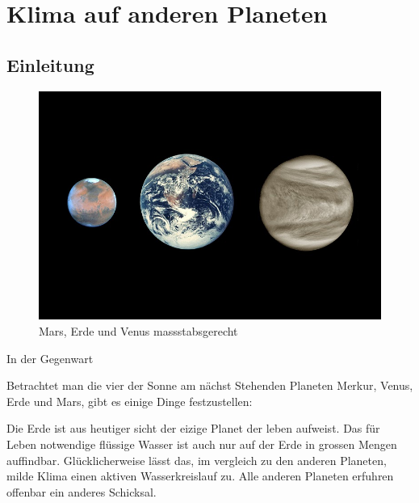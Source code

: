 %
%
%

\chapter{Klima auf anderen Planeten\label{chapter:thema}}
\begin{refsection}

\section{Einleitung}
\begin{figure}
	\centering
	\includegraphics[width=0.7\linewidth, trim={0 3cm 0 3cm},clip]{planeten/Pictures/planets.jpg}
	\caption{Mars, Erde und Venus massstabsgerecht}
\end{figure}




In der Gegenwart

Betrachtet man die vier der Sonne am nächst Stehenden Planeten Merkur, Venus, Erde und Mars, gibt es einige Dinge festzustellen:

Die Erde ist aus heutiger sicht der eizige Planet der leben aufweist. Das für Leben notwendige flüssige Wasser ist auch nur auf der Erde in grossen Mengen auffindbar. Glücklicherweise lässt das, im vergleich zu den anderen Planeten, milde Klima einen aktiven Wasserkreislauf zu.
Alle anderen Planeten erfuhren offenbar ein anderes Schicksal.


\end{refsection}
